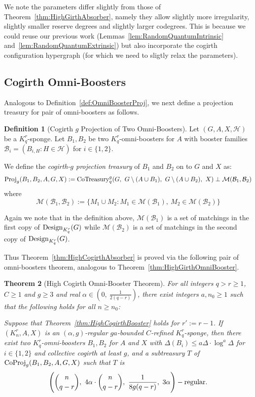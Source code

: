 \documentclass[11pt]{article}
\newcommand{\mc}[1]{\mathcal{#1}}
\newcounter{i}
\theoremstyle{plain}
\newtheorem{thm}{Theorem}[section]
\theoremstyle{plain} %
\theoremstyle{definition}
\newtheorem{definition}[thm]{Definition}
\begin{document}
We note the parameters differ slightly from those of Theorem~\ref{thm:HighGirthAbsorber}, namely they allow slightly more irregularity, slightly smaller reserve degrees and slightly larger  codegrees. This is because we could reuse our previous work (Lemmas~\ref{lem:RandomQuantumIntrinsic} and~\ref{lem:RandomQuantumExtrinsic}) but also incorporate the cogirth configuration hypergraph (for which we need to sligtly relax the parameters).

\subsection{Cogirth Omni-Boosters}

Analogous to Definition~\ref{def:OmniBoosterProj}, we next define a projection treasury for pair of omni-boosters as follows.

\begin{definition}[Cogirth $g$ Projection of Two Omni-Boosters]\label{def:OmniBoosterCoproj}
Let $(G,A,X,\mc{H})$ be a $K_q^r$-sponge. Let $B_1,B_2$ be two $K_q^r$-omni-boosters for $A$ with booster families $\mathcal{B}_i=(B_{i,H}:H\in\mathcal{H})$ for $i\in \{1,2\}$. 

We define the \emph{cogirth-$g$ projection treasury} of $B_1$ and $B_2$ on to $G$ and $X$ as:
$${\rm Proj}_g(B_1,B_2,A,G,X) := {\rm CoTreasury}_q^g(G,~G\setminus (A\cup B_1),~G\setminus (A\cup B_2),~X)\perp \mathcal{M}(\mc{B}_1,\mc{B}_2)$$
where
$$\mathcal{M}(\mc{B}_1,\mc{B}_2) := \{ M_1\cup M_2: M_1\in \mc{M}(\mc{B}_1),~ M_2\in \mc{M}(\mc{B}_2)\}$$
\end{definition}
Again we note that in the definition above, $\mc{M}(\mc{B}_1)$ is a set of matchings in the first copy of ${\rm Design}_{K_q^r}(G)$ while $\mc{M}(\mc{B}_2)$ is a set of matchings in the second copy of ${\rm Design}_{K_q^r}(G)$.


Thus Theorem~\ref{thm:HighCogirthAbsorber} is proved via the following pair of omni-boosters theorem, analogous to Theorem~\ref{thm:HighGirthOmniBooster}. 

\begin{thm}[High Cogirth Omni-Booster Theorem]\label{thm:HighCogirthOmniBooster}
For all integers $q>r\ge 1$, $C\ge 1$ and $g\ge 3$ and real $\alpha \in \left(0,~\frac{1}{2(q-r)}\right)$, there exist integers $a,n_0\ge 1$ such that the following holds for all $n\ge n_0$: 

Suppose that Theorem~\ref{thm:HighCogirthBooster} holds for $r':=r-1$. If $(K_n^r, A, X)$ is an $(\alpha,g)$-regular $ga$-bounded $C$-refined $K_q^r$-sponge, then there exist two $K_q^r$-omni-boosters $B_1,B_2$ for $A$ and $X$ with $\Delta(B_i)\le a\Delta\cdot \log^{a} \Delta$ for $i\in \{1,2\}$ and collective cogirth at least $g$, and a subtreasury $T$ of ${\rm CoProj}_g(B_1,B_2,A,G,X)$ such that $T$ is 
$$\Bigg(\binom{n}{q-r},~4\alpha \cdot \binom{n}{q-r},~\frac{1}{8g(q-r)},~3\alpha\Bigg)-{\rm regular}.$$
\end{thm}
\end{document}
